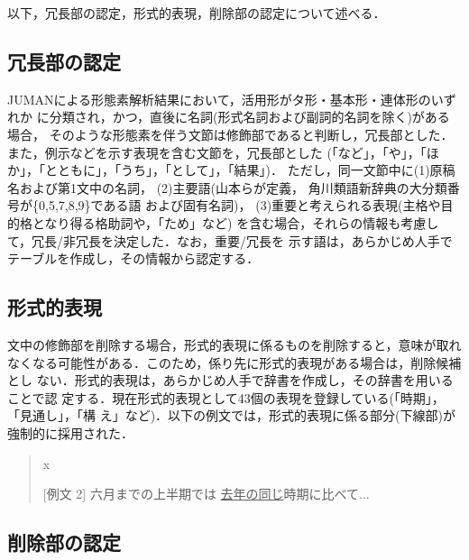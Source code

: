 以下，冗長部の認定，形式的表現，削除部の認定について述べる．

\subsection{冗長部の認定}
\label{section:jochobunintei}

JUMANによる形態素解析結果において，活用形がタ形・基本形・連体形のいずれか
に分類され，かつ，直後に名詞(形式名詞および副詞的名詞を除く)がある場合，
そのような形態素を伴う文節は修飾部であると判断し，冗長部とした．
また，例示などを示す表現を含む文節を，冗長部とした
(「など」，「や」，「ほか」，「とともに」，「うち」，「として」，「結果」)．
ただし，同一文節中に(1)原稿名および第1文中の名詞，
(2)主要語(山本ら\cite{YamamotoAndMasuyamaAndNaito1995}が定義，
角川類語新辞典\cite{kadokawa}の大分類番号が\{0,5,7,8,9\}である語
および固有名詞)，
\label{part:002}
(3)重要と考えられる表現(主格や目的格となり得る格助詞や，「ため」など)
\label{part:003}
を含む場合，それらの情報も考慮して，冗長/非冗長を決定した．なお，重要/冗長を
示す語は，あらかじめ人手でテーブルを作成し，その情報から認定する．

\subsection{形式的表現}
\label{section:keishikitekihyogen}

文中の修飾部を削除する場合，形式的表現に係るものを削除すると，意味が取れ
なくなる可能性がある．このため，係り先に形式的表現がある場合は，削除候補とし
ない．形式的表現は，あらかじめ人手で辞書を作成し，その辞書を用いることで認
定する．現在形式的表現として43個の表現を登録している(「時期」，「見通し」，「構
え」など)．以下の例文では，形式的表現に係る部分(下線部)が強制的に採用された．
\begin{quote}
 \begin{namelist}{x}
  
  \item[{[例文 2]}] 六月までの上半期では
	    \underline{去年の同じ}時期に比べて...
 \end{namelist}
\end{quote}

\subsection{削除部の認定}
\label{section:sakujobunintei}

